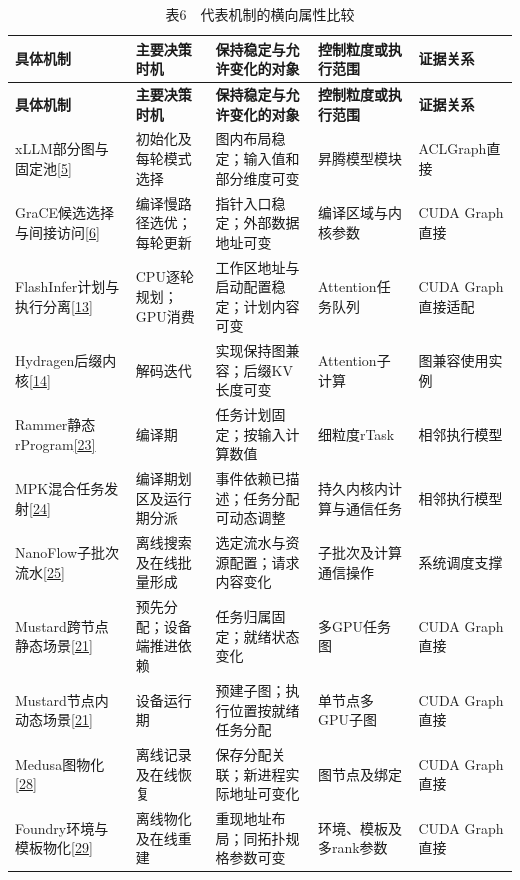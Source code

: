 \documentclass[UTF8,11pt,fontset=windows]{ctexart}
\begin{document}
\begingroup\small
\begin{longtable}[]{@{}>{\raggedright\arraybackslash}p{}>{\raggedright\arraybackslash}p{}>{\raggedright\arraybackslash}p{}>{\raggedright\arraybackslash}p{}>{\raggedright\arraybackslash}p{}@{}}
\caption{表6　代表机制的横向属性比较}\tabularnewline
\toprule
\textbf{具体机制} & \textbf{主要决策时机} & \textbf{保持稳定与允许变化的对象} & \textbf{控制粒度或执行范围} & \textbf{证据关系} \\
\midrule
\endfirsthead
\toprule
\textbf{具体机制} & \textbf{主要决策时机} & \textbf{保持稳定与允许变化的对象} & \textbf{控制粒度或执行范围} & \textbf{证据关系} \\
\midrule
\endhead
xLLM部分图与固定池\protect\hyperlink{ref-5}{{[}5{]}} & 初始化及每轮模式选择 & 图内布局稳定；输入值和部分维度可变 & 昇腾模型模块 & ACLGraph直接 \\
GraCE候选选择与间接访问\protect\hyperlink{ref-6}{{[}6{]}} & 编译慢路径选优；每轮更新 & 指针入口稳定；外部数据地址可变 & 编译区域与内核参数 & CUDA Graph直接 \\
FlashInfer计划与执行分离\protect\hyperlink{ref-13}{{[}13{]}} & CPU逐轮规划；GPU消费 & 工作区地址与启动配置稳定；计划内容可变 & Attention任务队列 & CUDA Graph直接适配 \\
Hydragen后缀内核\protect\hyperlink{ref-14}{{[}14{]}} & 解码迭代 & 实现保持图兼容；后缀KV长度可变 & Attention子计算 & 图兼容使用实例 \\
Rammer静态rProgram\protect\hyperlink{ref-23}{{[}23{]}} & 编译期 & 任务计划固定；按输入计算数值 & 细粒度rTask & 相邻执行模型 \\
MPK混合任务发射\protect\hyperlink{ref-24}{{[}24{]}} & 编译期划区及运行期分派 & 事件依赖已描述；任务分配可动态调整 & 持久内核内计算与通信任务 & 相邻执行模型 \\
NanoFlow子批次流水\protect\hyperlink{ref-25}{{[}25{]}} & 离线搜索及在线批量形成 & 选定流水与资源配置；请求内容变化 & 子批次及计算通信操作 & 系统调度支撑 \\
Mustard跨节点静态场景\protect\hyperlink{ref-21}{{[}21{]}} & 预先分配；设备端推进依赖 & 任务归属固定；就绪状态变化 & 多GPU任务图 & CUDA Graph直接 \\
Mustard节点内动态场景\protect\hyperlink{ref-21}{{[}21{]}} & 设备运行期 & 预建子图；执行位置按就绪任务分配 & 单节点多GPU子图 & CUDA Graph直接 \\
Medusa图物化\protect\hyperlink{ref-28}{{[}28{]}} & 离线记录及在线恢复 & 保存分配关联；新进程实际地址可变化 & 图节点及绑定 & CUDA Graph直接 \\
Foundry环境与模板物化\protect\hyperlink{ref-29}{{[}29{]}} & 离线物化及在线重建 & 重现地址布局；同拓扑规格参数可变 & 环境、模板及多rank参数 & CUDA Graph直接 \\
\bottomrule
\end{longtable}
\endgroup
\end{document}
